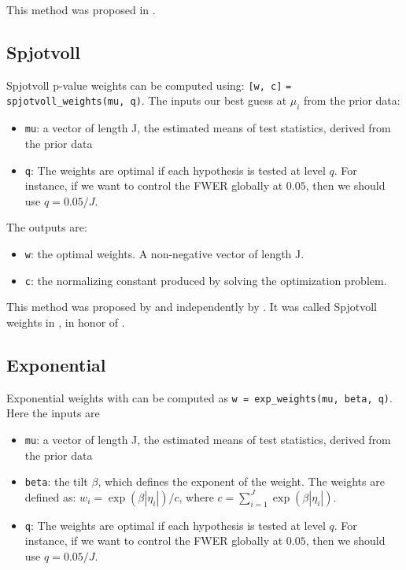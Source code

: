 \documentclass[english,11pt]{article} %
\begin{document}
This method was proposed in \cite{dobriban2015optimal}.

\subsection{Spjotvoll}


Spjotvoll p-value weights can be computed using:  \verb+[w, c]+ \verb+= spjotvoll_weights(mu, q)+. The inputs our best guess at $\mu_i$ from the prior data:

\begin{itemize}
\item \verb+mu+:  a vector of length J, the estimated means of test statistics, derived from the prior data
\item \verb+q+: The weights are optimal if each hypothesis is tested at level $q$. For instance, if we want to control the FWER globally at $0.05$, then we should use $q = 0.05/J$.
\end{itemize}

The outputs are: 
\begin{itemize}
\item \verb+w+:  the optimal weights. A non-negative vector of length J.
\item \verb+c+:  the normalizing constant produced by solving the optimization problem.
\end{itemize}

This method was proposed by \cite{wasserman2006weighted, roeder2009genome} and independently by \cite{rubin2006method}. It was called Spjotvoll weights in  \cite{dobriban2015optimal}, in honor of \citep{spjotvoll1972optimality}.

\subsection{Exponential}

Exponential weights with can be computed as \verb+w = exp_weights(mu, beta, q)+. Here the inputs are 

\begin{itemize}
\item \verb+mu+:  a vector of length J, the estimated means of test statistics, derived from the prior data
\item \verb+beta+:  the tilt $\beta$, which defines the exponent of the weight. The weights are defined as: $w_i = \exp(\beta|\eta_i|)/c$, where $c = \sum_{i=1}^{J}  \exp(\beta |\eta_i|)$.
\item \verb+q+: The weights are optimal if each hypothesis is tested at level $q$. For instance, if we want to control the FWER globally at $0.05$, then we should use $q = 0.05/J$.
\end{itemize}
\end{document}
